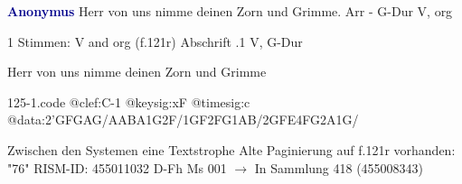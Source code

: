 \documentclass[twocolumn]{book}
\begin{document}
\newline \par \vspace{7pt} \textcolor{darkblue}{\textbf{Anonymus  }}
\newline Herr von uns nimme deinen Zorn und Grimme. Arr - G-Dur
\newline V, org
\newline \begin{itshape}\end{itshape} 
\newline \textcolor{darkblue}{}  1 Stimmen: V and org  (f.121r)
\newline Abschrift
.1  V, G-Dur
\newline \begin{footnotesize} Herr von uns nimme deinen Zorn und Grimme \end{footnotesize}  
\begin{filecontents*}{125-1.code}
@clef:C-1
@keysig:xF
@timesig:c
@data:2'GFGAG/AABA1G2F/1GF2FG1AB/2GFE4FG2A1G/
\end{filecontents*}
\newline
%
\newline Zwischen den Systemen eine Textstrophe
\newline Alte Paginierung auf f.121r vorhanden: "76"
\newline RISM-ID: 455011032
\newline D-Fh  Ms 001
\newline $\rightarrow$ In Sammlung 418 (455008343)
      
\end{document}
